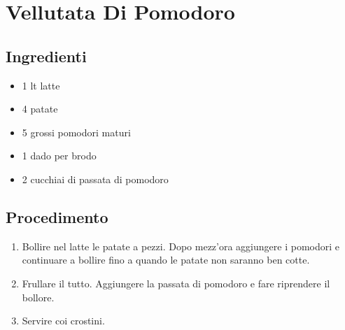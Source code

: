 \section{Vellutata Di Pomodoro}
\subsection{Ingredienti}
\begin{itemize}
\item 1 lt latte   
\item 4 patate  
\item 5 grossi pomodori maturi  
\item 1 dado per brodo  
\item 2 cucchiai di passata di pomodoro
\end{itemize}
\subsection{Procedimento}
\begin{enumerate}
\item  Bollire nel latte le patate a pezzi. Dopo mezz'ora aggiungere i pomodori e continuare a bollire fino a quando le patate non saranno ben cotte.   
\item  Frullare il tutto. Aggiungere la passata di pomodoro e fare riprendere il bollore.  
\item  Servire coi crostini.
\end{enumerate}
